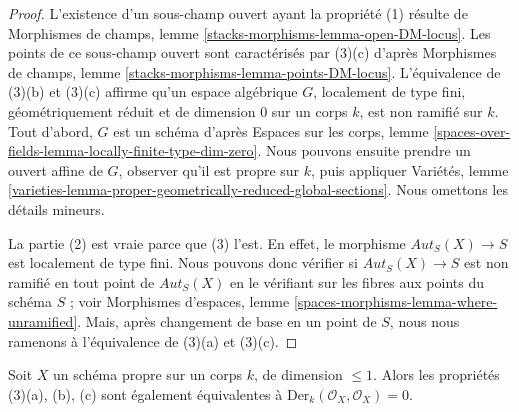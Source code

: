 \begin{proof}
L'existence d'un sous-champ ouvert ayant la propriété (1) résulte de
Morphismes de champs, lemme \ref{stacks-morphisms-lemma-open-DM-locus}.
Les points de ce sous-champ ouvert sont caractérisés par (3)(c) d'après
Morphismes de champs, lemme \ref{stacks-morphisms-lemma-points-DM-locus}.
L'équivalence de (3)(b) et (3)(c) affirme qu'un espace algébrique $G$,
localement de type fini, géométriquement réduit et de dimension $0$ sur
un corps $k$, est non ramifié sur $k$.
Tout d'abord, $G$ est un schéma d'après Espaces sur les corps, lemme
\ref{spaces-over-fields-lemma-locally-finite-type-dim-zero}.
Nous pouvons ensuite prendre un ouvert affine de $G$, observer
qu'il est propre sur $k$, puis appliquer Variétés, lemme
\ref{varieties-lemma-proper-geometrically-reduced-global-sections}.
Nous omettons les détails mineurs.

\medskip\noindent
La partie (2) est vraie parce que (3) l'est. En effet, le morphisme
$\mathit{Aut}_S(X) \to S$ est localement de type fini. Nous pouvons donc
vérifier si $\mathit{Aut}_S(X) \to S$ est non ramifié en tout point de
$\mathit{Aut}_S(X)$ en le vérifiant sur les fibres aux points du schéma $S$ ;
voir Morphismes d'espaces, lemme
\ref{spaces-morphisms-lemma-where-unramified}.
Mais, après changement de base en un point de $S$, nous nous ramenons à
l'équivalence de (3)(a) et (3)(c).
\end{proof}

\begin{lemma}
\label{lemma-in-DM-locus-vector-fields}
Soit $X$ un schéma propre sur un corps $k$, de dimension $\leq 1$.
Alors les propriétés (3)(a), (b), (c) sont également équivalentes à
$\text{Der}_k(\mathcal{O}_X, \mathcal{O}_X) = 0$.
\end{lemma}


